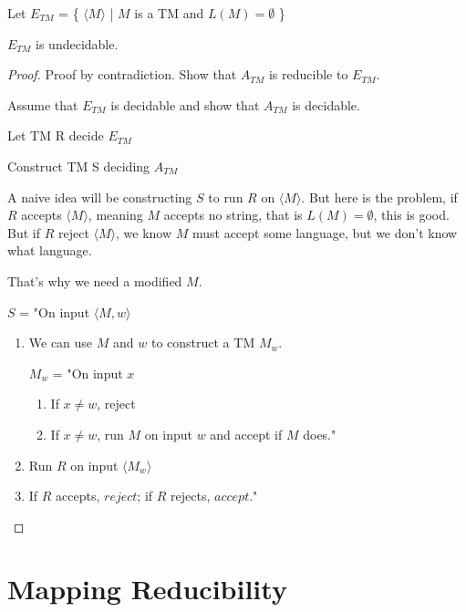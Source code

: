 \begin{theorem}
    Let \(E_{TM}\) = \{ \(\langle M \rangle\) | \(M\) is a TM and \(L(M) = \emptyset\) \}

    \(E_{TM}\) is undecidable. 
\end{theorem}
\begin{proof}
    Proof by contradiction. Show that \(A_{TM}\) is reducible to \(E_{TM}\).  

    Assume that \(E_{TM}\) is decidable and show that \(A_{TM}\) is decidable.  

    Let TM R decide \(E_{TM}\) 

    Construct TM S deciding \(A_{TM}\) 

    \begin{remark}
        A naive idea will be constructing \(S\) to run \(R\) on \(\langle M \rangle\). 
        But here is the problem, if \(R\) accepts \(\langle M \rangle\), meaning \(M\) accepts no string, that is \(L(M) = \emptyset\), this is good.    
        But if \(R\) reject \(\langle M \rangle\), we know \(M\) must accept some language, but we don't know what language.   
        
        That's why we need a modified \(M\). 
    \end{remark}

    \(S\) = "On input \(\langle M, w \rangle\) 
    \begin{enumerate}
        \item We can use \(M\) and \(w\) to construct a TM \(M_w\). 

        \(M_w\) = "On input \(x\)
        \begin{enumerate}
            \item If \(x \neq w\), reject
            \item If \(x \neq w\), run \(M\) on input \(w\) and accept if \(M\) does."
        \end{enumerate}  

        \item Run \(R\) on input \(\langle M_w \rangle\)
        \item If \(R\) accepts, \(reject\); if \(R\) rejects, \(accept\)."      
    \end{enumerate}
\end{proof}

\section{Mapping Reducibility}

